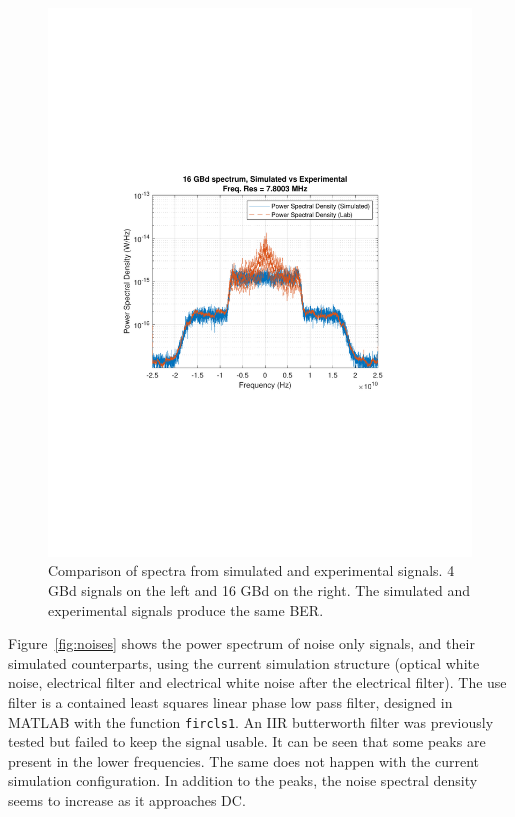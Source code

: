\begin{figure}[H]
\begin{minipage}{0.43\textwidth}
			\includegraphics[clip, trim=2cm 8cm 2cm 8cm,
			width=1\textwidth]{./sdf/m_qam_system/figures/experimental/exampleComparisons/lbsmSpec16GBdEfOptNH.pdf}
			\subcaption{\label{fig:specSuper16}}
		\end{minipage}
		\caption{Comparison of spectra from simulated and experimental signals. 4 GBd signals on the
		left and 16 GBd on the right. The simulated and experimental signals produce the same BER.\label{fig:specSuperPosition}}
	\end{figure}


	Figure~\ref{fig:noises} shows the power spectrum of noise only signals,
	and their simulated counterparts, using the current simulation structure
	(optical white noise, electrical filter and electrical white noise after the
	electrical filter). The use filter is a contained least squares linear phase
	low pass filter, designed in MATLAB with the function \texttt{fircls1}. An IIR
	butterworth filter was previously tested but failed to keep the signal usable.
	It can be seen that some peaks are present in the lower frequencies. The
	same does not happen with the current simulation configuration. In addition to
	the peaks, the noise spectral density seems to increase as it approaches DC.


